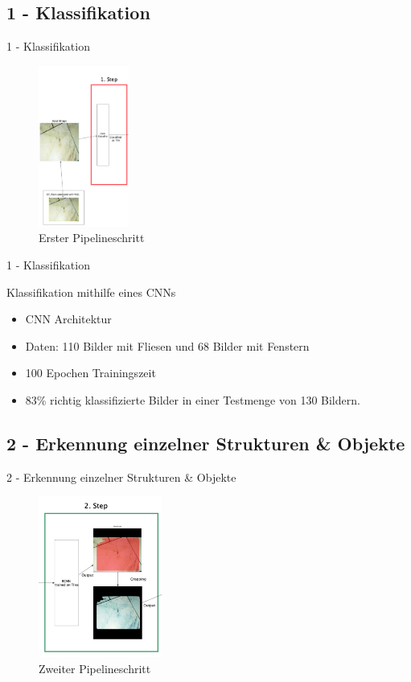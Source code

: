 \documentclass[9pt]{beamer}
\begin{document}
\subsection{1 - Klassifikation}
\begin{frame}{1 - Klassifikation}
\begin{figure}
	\includegraphics[height=200px]{./fig/1}
	\caption{Erster Pipelineschritt}
\end{figure}
\end{frame}

\begin{frame}{1 - Klassifikation}
\begin{block}{Klassifikation mithilfe eines CNNs}
	\begin{itemize}
		\item CNN Architektur
		\item Daten: 110 Bilder mit Fliesen und 68 Bilder mit Fenstern
		\item 100 Epochen Trainingszeit
		\item 83\% richtig klassifizierte Bilder in einer Testmenge von 130 Bildern.
		
	\end{itemize}
\end{block}
\end{frame}

\subsection{2 - Erkennung einzelner Strukturen \& Objekte}
\begin{frame}{2 - Erkennung einzelner Strukturen \& Objekte}
\begin{figure}
	\includegraphics[height=200px]{./fig/2}
	\caption{Zweiter Pipelineschritt}
\end{figure}
\end{frame}
\end{document}
